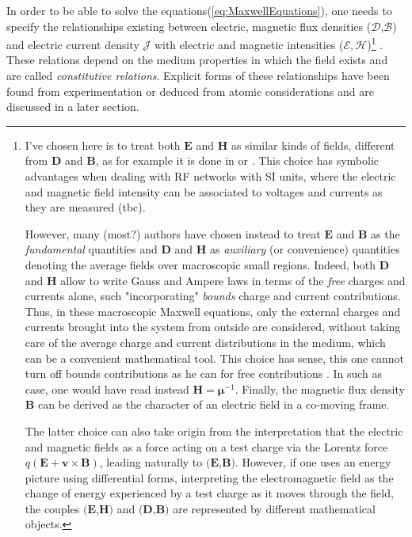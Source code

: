 In order to be able to solve the  equations(\ref{eq:MaxwellEquations}), one needs to specify the relationships existing between electric, magnetic flux densities ($\mathcal{D}$,$\mathcal{B}$) and electric current density $\mathcal{J}$ with electric and magnetic intensities ($\mathcal{E},\mathcal{H}$)\footnote{
	I've chosen here is to treat both $\mathbf{E}$ and $\mathbf{H}$ as similar kinds of fields, different from $\mathbf{D}$ and $\mathbf{B}$, as for example it is done in \parencite{Pozar1998} or \parencite{Harrington2001}. This choice has symbolic advantages when dealing with RF networks with SI units, where the electric and magnetic field intensity can be associated to voltages and currents as they are measured (tbc).
	
	However, many (most?) authors have chosen instead to treat $\mathbf{E}$ and $\mathbf{B}$ as the \emph{fundamental} quantities and $\mathbf{D}$ and $\mathbf{H}$ as \textit{auxiliary} (or convenience) quantities denoting the average fields over macroscopic small regions\parencite{Lindell1995, Griffiths2005, Jackson1999}. Indeed, both $\mathbf{D}$ and $\mathbf{H}$ allow to write Gauss and Ampere laws in terms of the \emph{free} charges and currents alone, such "incorporating" \emph{bounds} charge and current contributions. Thus, in these macroscopic Maxwell equations, only the external charges and currents brought into the system from outside are considered, without taking care of the average charge and current distributions in the medium, which can be a convenient mathematical tool. This choice has sense, this one cannot turn off bounds contributions as he can for free contributions \parencite[sec.6.3]{Griffiths2005}. In such as case, one would have read instead $\mathbf{H}=\boldsymbol{\mu}^{-1} $. Finally, the magnetic flux density $\mathbf{B}$ can be derived as the character of an electric field in a co-moving frame\parencite{Schwinger1998}.
	
	The latter choice can also take origin from the interpretation that the electric and magnetic fields as a force acting on a test charge via the Lorentz force $q(\mathbf{E}+\mathbf{v}\times\mathbf{B})$, leading naturally to $(\mathbf{E}$,$\mathbf{B})$. However, if one uses an energy picture using differential forms, interpreting the electromagnetic field as the change of energy experienced by a test charge as it moves through the field, the couples $(\mathbf{E}$,$\mathbf{H})$ and $(\mathbf{D}$,$\mathbf{B})$ are represented by different mathematical objects\parencite{Warnick2014}. 
	}
. These relations depend on the medium properties in which the field exists and are called \emph{constitutive relations}. Explicit forms of these relationships have been found from experimentation or deduced from atomic considerations \parencite[sec.5]{Schwinger1998} and are discussed in a later section.


